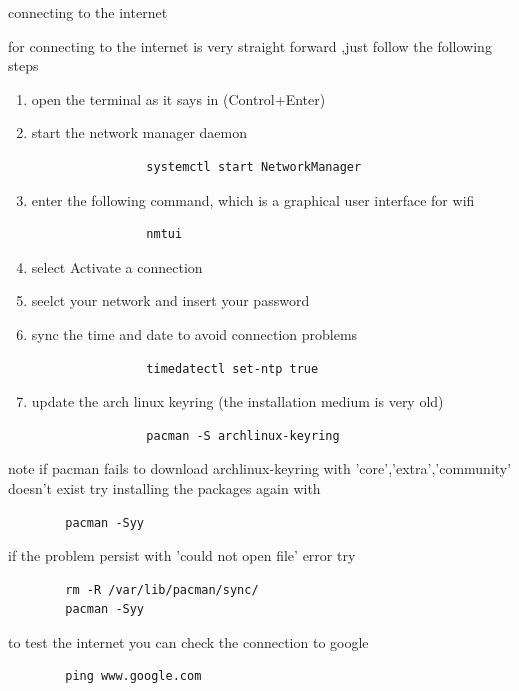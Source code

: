 \begin{section}{connecting to the internet}
	\begin{Large}
		for connecting to the internet is very straight forward
		,just follow the following steps
	\end{Large}
	\begin{enumerate}
		\item 
			open the terminal as it says in (Control+Enter)
		\item
			start the network manager daemon
			\begin{verbatim}
				systemctl start NetworkManager
			\end{verbatim}
		\item
			enter the following command, which is a graphical user interface for wifi
			\begin{verbatim}
				nmtui
			\end{verbatim}
		\item 
			select Activate a connection
		\item 
			seelct your network and insert your password
		\item
			sync the time and date to avoid connection problems
			\begin{verbatim}
				timedatectl set-ntp true
			\end{verbatim}
		\item
			update the arch linux keyring (the installation medium is very old)
			\begin{verbatim}
				pacman -S archlinux-keyring
			\end{verbatim}

	\end{enumerate}
	note if pacman fails to download archlinux-keyring with 'core','extra','community' doesn't exist try installing the packages again with
	\begin{verbatim}
		pacman -Syy
	\end{verbatim}
	if the problem persist with 'could not open file' error try
	\begin{verbatim}
		rm -R /var/lib/pacman/sync/
		pacman -Syy
	\end{verbatim}
	to test the internet you can check the connection to google
	\begin{verbatim}
		ping www.google.com
	\end{verbatim}
\end{section}
\newpage
